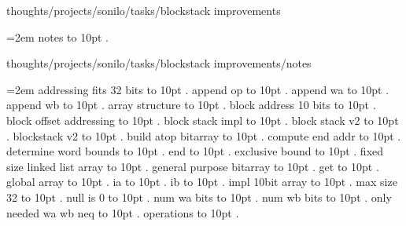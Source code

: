 \bigskip
{}
thoughts/projects/sonilo/tasks/blockstack improvements
\par\begingroup
\leftskip=2em
\smallskip
notes \leaders\hbox to 10pt {\hss.\hss}  \hfill {}
\smallskip
\medskip
\par\endgroup
\bigskip
{}
thoughts/projects/sonilo/tasks/blockstack improvements/notes
\par\begingroup
\leftskip=2em
\smallskip
\medskip
addressing fits 32 bits \leaders\hbox to 10pt {\hss.\hss}  \hfill {}
\smallskip
append op \leaders\hbox to 10pt {\hss.\hss}  \hfill {}
\smallskip
append wa \leaders\hbox to 10pt {\hss.\hss}  \hfill {}
\smallskip
append wb \leaders\hbox to 10pt {\hss.\hss}  \hfill {}
\smallskip
array structure \leaders\hbox to 10pt {\hss.\hss}  \hfill {}
\smallskip
block address 10 bits \leaders\hbox to 10pt {\hss.\hss}  \hfill {}
\smallskip
block offset addressing \leaders\hbox to 10pt {\hss.\hss}  \hfill {}
\smallskip
block stack impl \leaders\hbox to 10pt {\hss.\hss}  \hfill {}
\smallskip
block stack v2 \leaders\hbox to 10pt {\hss.\hss}  \hfill {}
\smallskip
blockstack v2 \leaders\hbox to 10pt {\hss.\hss}  \hfill {}
\smallskip
build atop bitarray \leaders\hbox to 10pt {\hss.\hss}  \hfill {}
\smallskip
compute end addr \leaders\hbox to 10pt {\hss.\hss}  \hfill {}
\smallskip
determine word bounds \leaders\hbox to 10pt {\hss.\hss}  \hfill {}
\smallskip
end \leaders\hbox to 10pt {\hss.\hss}  \hfill {}
\smallskip
exclusive bound \leaders\hbox to 10pt {\hss.\hss}  \hfill {}
\smallskip
fixed size linked list array \leaders\hbox to 10pt {\hss.\hss}  \hfill {}
\smallskip
general purpose bitarray \leaders\hbox to 10pt {\hss.\hss}  \hfill {}
\smallskip
get \leaders\hbox to 10pt {\hss.\hss}  \hfill {}
\smallskip
global array \leaders\hbox to 10pt {\hss.\hss}  \hfill {}
\smallskip
ia \leaders\hbox to 10pt {\hss.\hss}  \hfill {}
\smallskip
ib \leaders\hbox to 10pt {\hss.\hss}  \hfill {}
\smallskip
impl 10bit array \leaders\hbox to 10pt {\hss.\hss}  \hfill {}
\smallskip
max size 32 \leaders\hbox to 10pt {\hss.\hss}  \hfill {}
\smallskip
null is 0 \leaders\hbox to 10pt {\hss.\hss}  \hfill {}
\smallskip
num wa bits \leaders\hbox to 10pt {\hss.\hss}  \hfill {}
\smallskip
num wb bits \leaders\hbox to 10pt {\hss.\hss}  \hfill {}
\smallskip
only needed wa wb neq \leaders\hbox to 10pt {\hss.\hss}  \hfill {}
\smallskip
operations \leaders\hbox to 10pt {\hss.\hss}  \hfill {}

